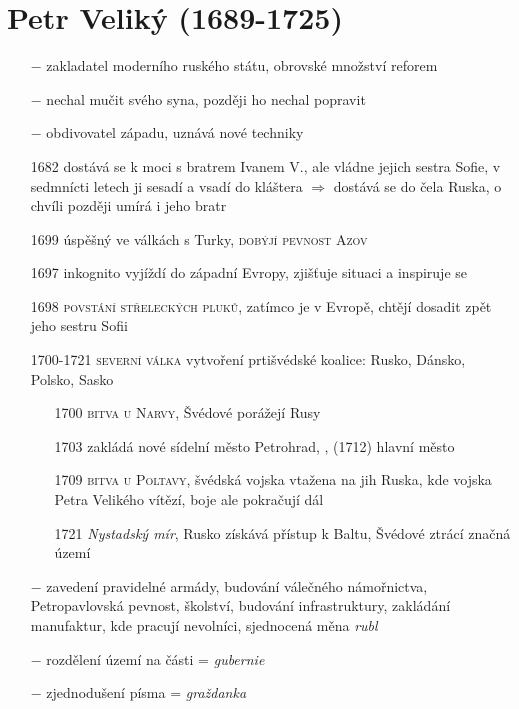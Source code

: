 \documentclass{article}
\begin{document}
\section*{Petr Veliký (1689-1725)}
\begin{itemize}
    \vspace{-0.5em}
    \setlength\itemsep{0.15em}
    \item[$-$] zakladatel moderního ruského státu, obrovské množství reforem
    \item[$-$] nechal mučit svého syna, později ho nechal popravit
    \item[$-$] obdivovatel západu, uznává nové techniky
    \item[1682] dostává se k moci s bratrem Ivanem V., ale vládne jejich sestra Sofie, v sedmnícti letech ji sesadí a vsadí do kláštera $\Rightarrow$ dostává se do čela Ruska, o chvíli později umírá i jeho bratr
    \item[1699] úspěšný ve válkách s Turky, \textsc{dobýjí pevnost Azov}
    \item[1697]  inkognito vyjíždí do západní Evropy, zjišťuje situaci a inspiruje se
    \item[1698] \textsc{povstání střeleckých pluků}, zatímco je v Evropě, chtějí dosadit zpět jeho sestru Sofii
    \item[1700-1721] \textsc{severní válka} vytvoření prtišvédské koalice: Rusko, Dánsko, Polsko, Sasko
    \begin{itemize}
        \vspace{-0.5em}
        \setlength\itemsep{0.15em}
        \item[1700] \textsc{bitva u Narvy}, Švédové porážejí Rusy
        \item[1703] zakládá nové sídelní město Petrohrad, , (1712) hlavní město
        \item[1709]  \textsc{bitva u Poltavy}, švédská vojska vtažena na jih Ruska, kde vojska Petra Velikého vítězí, boje ale pokračují dál
        \item[1721] \textit{Nystadský mír}, Rusko získává přístup k Baltu,  Švédové ztrácí značná území
    \end{itemize}
    \item[$-$] zavedení pravidelné armády, budování válečného námořnictva, Petropavlovská pevnost, školství, budování infrastruktury, zakládání manufaktur, kde pracují nevolníci, sjednocená měna \textit{rubl}
    \item[$-$] rozdělení území na části = \textit{gubernie}
    \item[$-$] zjednodušení písma = \textit{graždanka}  
\end{itemize}
\end{document}
